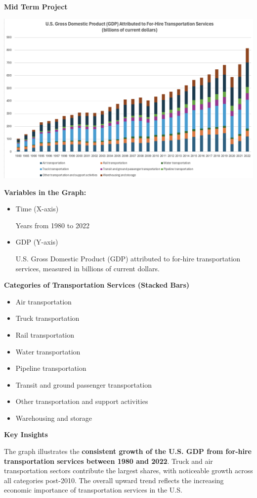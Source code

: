 \documentclass[
  letterpaper,
  DIV=11,
  numbers=noendperiod]{scrreprt}
\providecommand{\tightlist}{%
  \setlength{\itemsep}{0pt}\setlength{\parskip}{0pt}}\usepackage{longtable,booktabs,array}
\begin{document}
\textbf{Mid Term Project}

\includegraphics{./GDP-TransportationServices.png}

\textbf{Variables in the Graph:}

\begin{itemize}
\item
  Time (X-axis)

  Years from 1980 to 2022
\item
  GDP (Y-axis)

  U.S. Gross Domestic Product (GDP) attributed to for-hire
  transportation services, measured in billions of current dollars.
\end{itemize}

\textbf{Categories of Transportation Services (Stacked Bars)}

\begin{itemize}
\tightlist
\item
  Air transportation
\item
  Truck transportation
\item
  Rail transportation
\item
  Water transportation
\item
  Pipeline transportation
\item
  Transit and ground passenger transportation
\item
  Other transportation and support activities
\item
  Warehousing and storage
\end{itemize}

\textbf{Key Insights}

The graph illustrates the \textbf{consistent growth of the U.S. GDP from
for-hire transportation services between 1980 and 2022}. Truck and air
transportation sectors contribute the largest shares, with noticeable
growth across all categories post-2010. The overall upward trend
reflects the increasing economic importance of transportation services
in the U.S.
\end{document}

